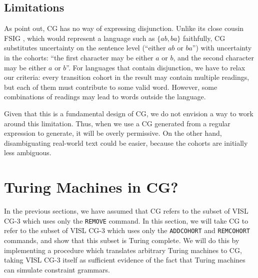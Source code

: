 \documentclass[11pt]{article}
\def\t#1{\texttt{#1}}
\def\exampleWord{{\color{red} TODO}}
\begin{document}



\subsection{Limitations}
As  point out, CG has no way of expressing disjunction.
Unlike its close cousin FSIG \cite{koskenniemi90}, which would represent a 
language such as $\{ab,ba\}$ faithfully, CG substitutes uncertainty on the 
sentence level (``either $ab$ or $ba$'') with uncertainty in the cohorts: 
``the first character may be either $a$ or $b$, and the second character 
may be either $a$ or $b$''.
For languages that contain disjunction, we have to relax our criteria:
every transition cohort in the result may contain multiple readings,
but each of them must contribute to some valid word. However, some
combinations of readings may lead to words outside the language.

Given that this is a fundamental design of CG, we do not envision a way to work
around this limitation. Thus, when we use a CG generated from a regular
expression to generate, it will be overly permissive. On the other
hand, disambiguating real-world text could be easier, because the
cohorts are initially less ambiguous.


\section{Turing Machines in CG?}\label{sec:turingcomplete}
In the previous sections, we have assumed that CG refers to the subset of VISL
CG-3 which uses only the \t{REMOVE} command. In this section, we will take CG to
refer to the subset of VISL CG-3 which uses only the \t{ADDCOHORT} and
\t{REMCOHORT} commands, and show that this subset is Turing complete.
We will do this by implementing a procedure which translates arbitrary Turing
machines to CG, taking VISL CG-3 itself as sufficient evidence of the fact that
Turing machines can simulate constraint grammars.
\end{document}

